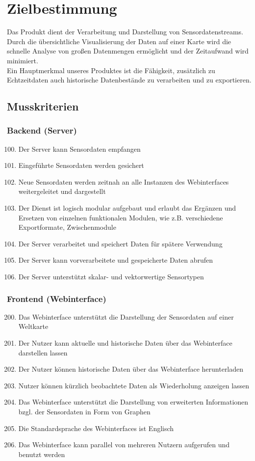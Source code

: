 \chapter{Zielbestimmung}
Das Produkt dient der Verarbeitung und Darstellung von Sensordatenstreams. Durch die übersichtliche Visualisierung der Daten auf einer Karte wird die schnelle Analyse von großen Datenmengen ermöglicht und der Zeitaufwand wird minimiert.\\
Ein Hauptmerkmal unseres Produktes ist die Fähigkeit, zusätzlich zu Echtzeitdaten auch historische Datenbestände zu verarbeiten und zu exportieren.
\section{Musskriterien}
\subsection{Backend (Server)}
\begin{enumerate}[label=\textbf{MK\arabic{enumi}0}]
	\setcounter{enumi}{99}
	\item Der Server kann Sensordaten empfangen
	\item Eingeführte Sensordaten werden gesichert
	\item Neue Sensordaten werden zeitnah an alle Instanzen des Webinterfaces weitergeleitet und dargestellt
	\item Der Dienst ist logisch modular aufgebaut und erlaubt das Ergänzen und Ersetzen von einzelnen funktionalen Modulen, wie z.B. verschiedene Exportformate, Zwischenmodule
	\item Der Server verarbeitet und speichert Daten für spätere Verwendung
	\item Der Server kann vorverarbeitete und gespeicherte Daten abrufen
	\item Der Server unterstützt skalar- und vektorwertige Sensortypen
\end{enumerate}
\subsection{Frontend (Webinterface)}
\begin{enumerate}[label=\textbf{MK\arabic{enumi}0}]
	\setcounter{enumi}{199}
	\item Das Webinterface unterstützt die Darstellung der Sensordaten auf einer Weltkarte
	\item Der Nutzer kann aktuelle und historische Daten über das Webinterface darstellen lassen
	\item Der Nutzer können historische Daten über das Webinterface herunterladen
	\item Nutzer können kürzlich beobachtete Daten als Wiederholung anzeigen lassen
	\item Das Webinterface unterstützt die Darstellung von erweiterten Informationen bzgl. der Sensordaten in Form von Graphen
	\item Die Standardsprache des Webinterfaces ist Englisch
	\item Das Webinterface kann parallel von mehreren Nutzern aufgerufen und benutzt werden
\end{enumerate}

